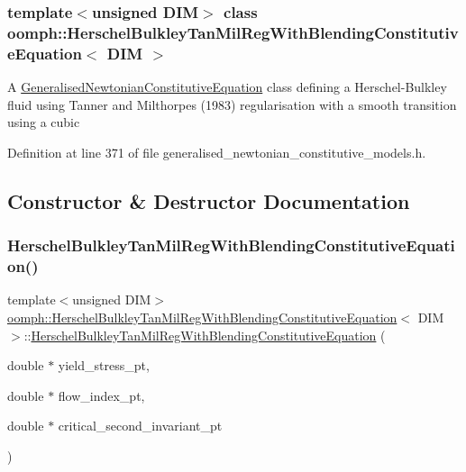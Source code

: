 \subsubsection*{template$<$unsigned D\+IM$>$\newline
class oomph\+::\+Herschel\+Bulkley\+Tan\+Mil\+Reg\+With\+Blending\+Constitutive\+Equation$<$ D\+I\+M $>$}

A \hyperlink{classoomph_1_1GeneralisedNewtonianConstitutiveEquation}{Generalised\+Newtonian\+Constitutive\+Equation} class defining a Herschel-\/\+Bulkley fluid using Tanner and Milthorpe\textquotesingle{}s (1983) regularisation with a smooth transition using a cubic 

Definition at line 371 of file generalised\+\_\+newtonian\+\_\+constitutive\+\_\+models.\+h.



\subsection{Constructor \& Destructor Documentation}
\mbox{\label{classoomph_1_1HerschelBulkleyTanMilRegWithBlendingConstitutiveEquation_a2d0011d44b05f948caa84c2ad0e8e907}} 
\subsubsection{\texorpdfstring{Herschel\+Bulkley\+Tan\+Mil\+Reg\+With\+Blending\+Constitutive\+Equation()}{HerschelBulkleyTanMilRegWithBlendingConstitutiveEquation()}}
{\footnotesize\ttfamily template$<$unsigned D\+IM$>$ \\
\hyperlink{classoomph_1_1HerschelBulkleyTanMilRegWithBlendingConstitutiveEquation}{oomph\+::\+Herschel\+Bulkley\+Tan\+Mil\+Reg\+With\+Blending\+Constitutive\+Equation}$<$ D\+IM $>$\+::\hyperlink{classoomph_1_1HerschelBulkleyTanMilRegWithBlendingConstitutiveEquation}{Herschel\+Bulkley\+Tan\+Mil\+Reg\+With\+Blending\+Constitutive\+Equation} (\begin{DoxyParamCaption}\item[{double $\ast$}]{yield\+\_\+stress\+\_\+pt,  }\item[{double $\ast$}]{flow\+\_\+index\+\_\+pt,  }\item[{double $\ast$}]{critical\+\_\+second\+\_\+invariant\+\_\+pt }\end{DoxyParamCaption})\hspace{0.3cm}{\ttfamily [inline]}}



